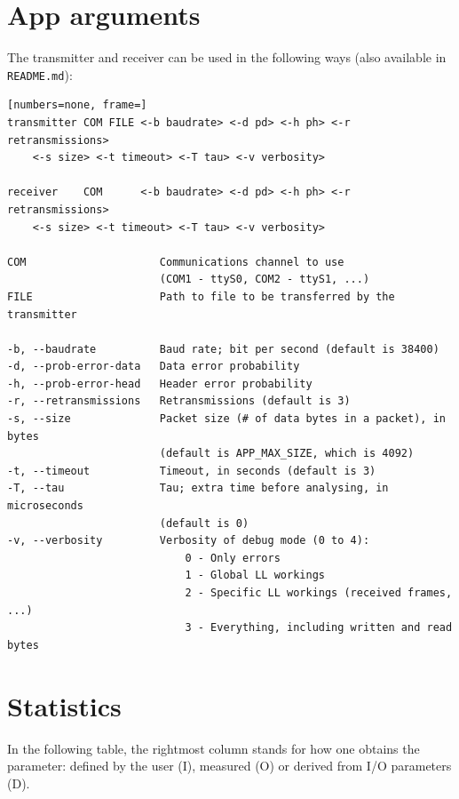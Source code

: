 \documentclass[a4paper, 11pt]{report}
\begin{document}
\chapter{App arguments} \label{ch:args}

The transmitter and receiver can be used in the following ways (also available in \texttt{README.md}):
\begin{lstlisting}[numbers=none, frame=]
transmitter COM FILE <-b baudrate> <-d pd> <-h ph> <-r retransmissions>
	<-s size> <-t timeout> <-T tau> <-v verbosity>

receiver    COM      <-b baudrate> <-d pd> <-h ph> <-r retransmissions>
	<-s size> <-t timeout> <-T tau> <-v verbosity>

COM                     Communications channel to use
						(COM1 - ttyS0, COM2 - ttyS1, ...)
FILE                    Path to file to be transferred by the transmitter

-b, --baudrate          Baud rate; bit per second (default is 38400)
-d, --prob-error-data   Data error probability
-h, --prob-error-head   Header error probability
-r, --retransmissions   Retransmissions (default is 3)
-s, --size              Packet size (# of data bytes in a packet), in bytes
						(default is APP_MAX_SIZE, which is 4092)
-t, --timeout           Timeout, in seconds (default is 3)
-T, --tau               Tau; extra time before analysing, in microseconds
						(default is 0)
-v, --verbosity         Verbosity of debug mode (0 to 4):
							0 - Only errors
							1 - Global LL workings
							2 - Specific LL workings (received frames, ...)
							3 - Everything, including written and read bytes
\end{lstlisting}

\chapter{Statistics} \label{ch:statistics}

In the following table, the rightmost column stands for how one obtains the parameter: defined by the user (I), measured (O) or derived from I/O parameters (D).
\end{document}
